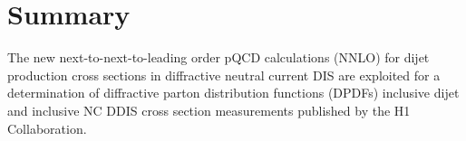 \documentclass[12pt]{article}
\begin{document}
\section{Summary}
The new next-to-next-to-leading order pQCD calculations (NNLO) for dijet
production cross sections in diffractive neutral current DIS are exploited for a
determination of diffractive parton distribution functions (DPDFs) inclusive
dijet and inclusive NC DDIS cross section measurements published by the H1 Collaboration. 







%
%
%



\clearpage

\end{document}
